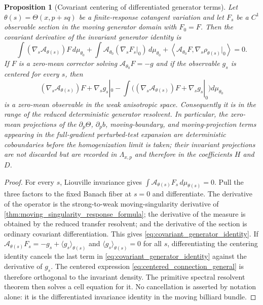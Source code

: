 \documentclass[12pt, letterpaper]{amsart}
\newcommand{\Acal}{\mathcal{A}}
\theoremstyle{plain}
\newtheorem{proposition}[theorem]{Proposition}
\theoremstyle{definition}
\theoremstyle{remark}
\begin{document}
\begin{proposition}[Covariant centering of differentiated generator terms]
\label{prop:covariant_centering_generator_terms}
Let $\theta(s)=\Theta(x,p+s q)$ be a finite-response cotangent variation and let
$F_s$ be a $C^1$ observable section in the moving generator domain with
$F_0=F$.  Then the covariant derivative of the invariant generator identity is
\begin{equation}
\label{eq:covariant_generator_identity}
    \int (\nabla_s\Acal_{\theta(s)})F\,d\mu_{\theta_0}
    +\int \Acal_{\theta_0}(\nabla_sF_s|_0)\,d\mu_{\theta_0}
    +\left\langle \Acal_{\theta_0}F,\nabla_s\rho_{\theta(s)}|_0\right\rangle=0 .
\end{equation}
If $F$ is a zero-mean corrector solving $\Acal_{\theta_0}F=-g$ and if the
observable $g_s$ is centered for every $s$, then
\begin{equation}
\label{eq:centered_connection_general}
    (\nabla_s\Acal_{\theta(s)})F+\nabla_s g_s|_0
      -\int\big((\nabla_s\Acal_{\theta(s)})F+\nabla_s g_s|_0\big)
        d\mu_{\theta_0}
\end{equation}
is a zero-mean observable in the weak anisotropic space.  Consequently it is in
the range of the reduced deterministic generator resolvent.  In particular, the
zero-mean projections of the $\partial_p\Theta$, $\partial_p b$,
moving-boundary, and moving-projection terms appearing in the full-gradient
perturbed-test expansion are deterministic coboundaries before the homogenization
limit is taken; their invariant projections are not discarded but are recorded in
$\Lambda_{x,p}$ and therefore in the coefficients $H$ and $D$.
\end{proposition}

\begin{proof}
For every $s$, Liouville invariance gives
$\int \Acal_{\theta(s)}F_s\,d\mu_{\theta(s)}=0$.  Pull the three factors to the
fixed Banach fiber at $s=0$ and differentiate.  The derivative of the operator
is the strong-to-weak moving-singularity derivative of
\cref{thm:moving_singularity_response_formula}; the derivative of the measure is
obtained by the reduced transfer resolvent; and the derivative of the section is
ordinary covariant differentiation.  This gives
\eqref{eq:covariant_generator_identity}.  If
$\Acal_{\theta(s)}F_s=-g_s+\langle g_s\rangle_{\theta(s)}$ and
$\langle g_s\rangle_{\theta(s)}=0$ for all $s$, differentiating the centering
identity cancels the last term in \eqref{eq:covariant_generator_identity}
against the derivative of $g_s$.  The centered expression
\eqref{eq:centered_connection_general} is therefore orthogonal to the invariant
density.  The primitive spectral resolvent theorem then solves a cell equation
for it.  No cancellation is asserted by notation alone: it is the differentiated
invariance identity in the moving billiard bundle.
\end{proof}
\end{document}
